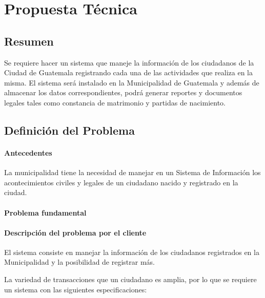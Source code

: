 \section*{Propuesta T\'{e}cnica}

\subsection{Resumen}

Se requiere hacer un sistema que maneje la informaci\'{o}n de los ciudadanos de la Ciudad de Guatemala registrando cada una de las actividades que realiza en la misma. El sistema ser\'{a} instalado en la Municipalidad de Guatemala y adem\'{a}s de almacenar los datos correspondientes, podr\'{a} generar reportes y documentos legales tales como constancia de matrimonio y partidas de nacimiento.

\subsection{Definici\'{o}n del Problema}

\paragraph{Antecedentes}

La municipalidad tiene la necesidad de manejar en un Sistema de Informaci\'{o}n los acontecimientos civiles y legales de un ciudadano nacido y registrado en la ciudad. 

\paragraph{Problema fundamental}

\paragraph{Descripci\'{o}n del problema por el cliente}

El sistema consiste en manejar la informaci\'{o}n de los ciudadanos registrados en la Municipalidad y la posibilidad de registrar m\'{a}s. 

La variedad de transacciones que un ciudadano es amplia, por lo que se requiere un sistema con las siguientes especificaciones:

